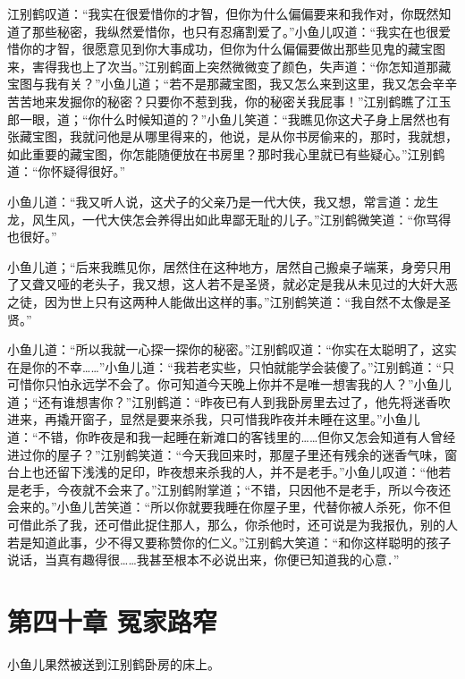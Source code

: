 \documentclass[12pt,oneside]{book}
\begin{document}
江别鹤叹道：``我实在很爱惜你的才智，但你为什么偏偏要来和我作对，你既然知道了那些秘密，我纵然爱惜你，也只有忍痛割爱了。''小鱼儿叹道：``我实在也很爱惜你的才智，很愿意见到你大事成功，但你为什么偏偏要做出那些见鬼的藏宝图来，害得我也上了次当。''江别鹤面上突然微微变了颜色，失声道：``你怎知道那藏宝图与我有关？''小鱼儿道；``若不是那藏宝图，我又怎么来到这里，我又怎会辛辛苦苦地来发掘你的秘密？只要你不惹到我，你的秘密关我屁事！''江别鹤瞧了江玉郎一眼，道；``你什么时候知道的？''小鱼儿笑道：``我瞧见你这犬子身上居然也有张藏宝图，我就问他是从哪里得来的，他说，是从你书房偷来的，那时，我就想，如此重要的藏宝图，你怎能随便放在书房里？那时我心里就已有些疑心。''江别鹤道：``你怀疑得很好。''

小鱼儿道：``我又听人说，这犬子的父亲乃是一代大侠，我又想，常言道：龙生龙，风生风，一代大侠怎会养得出如此卑鄙无耻的儿子。''江别鹤微笑道：``你骂得也很好。''

小鱼儿道；``后来我瞧见你，居然住在这种地方，居然自己搬桌子端莱，身旁只用了又聋又哑的老头子，我又想，这人若不是圣贤，就必定是我从未见过的大奸大恶之徒，因为世上只有这两种人能做出这样的事。''江别鹤笑道：``我自然不太像是圣贤。''

小鱼儿道：``所以我就一心探一探你的秘密。''江别鹤叹道：``你实在太聪明了，这实在是你的不幸\ldots\ldots{}''小鱼儿道：``我若老实些，只怕就能学会装傻了。''江别鹤道：``只可惜你只怕永远学不会了。你可知道今天晚上你并不是唯一想害我的人？''小鱼儿道；``还有谁想害你？''江别鹤道：``昨夜已有人到我卧房里去过了，他先将迷香吹进来，再撬开窗子，显然是要来杀我，只可惜我昨夜并未睡在这里。''小鱼儿道：``不错，你昨夜是和我一起睡在新滩口的客钱里的\ldots\ldots 但你又怎会知道有人曾经进过你的屋子？''江别鹤笑道：``今天我回来时，那屋子里还有残余的迷香气味，窗台上也还留下浅浅的足印，昨夜想来杀我的人，并不是老手。''小鱼儿叹道：``他若是老手，今夜就不会来了。''江别鹤附掌道；``不错，只因他不是老手，所以今夜还会来的。''小鱼儿苦笑道：``所以你就要我睡在你屋子里，代替你被人杀死，你不但可借此杀了我，还可借此捉住那人，那么，你杀他时，还可说是为我报仇，别的人若是知道此事，少不得又要称赞你的仁义。''江别鹤大笑道：``和你这样聪明的孩子说话，当真有趣得很\ldots\ldots 我甚至根本不必说出来，你便已知道我的心意．''

\hypertarget{ux7b2cux56dbux5341ux7ae0-ux51a4ux5bb6ux8defux7a84}{%
\chapter{第四十章
冤家路窄}\label{ux7b2cux56dbux5341ux7ae0-ux51a4ux5bb6ux8defux7a84}}

小鱼儿果然被送到江别鹤卧房的床上。
\end{document}
